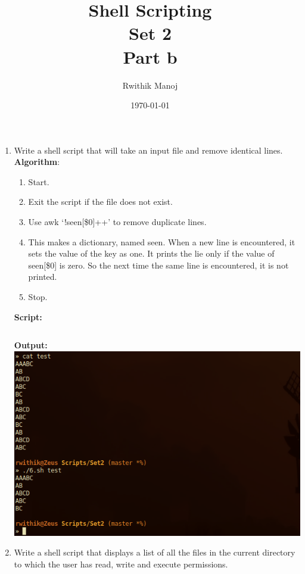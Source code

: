 \documentclass[10pt,a4paper,titlepage]{report}
\begin{document}
\begin{titlepage}
\author{Rwithik Manoj}
\title{Shell Scripting\\Set 2\\Part b}
\date{\today}
\maketitle
\end{titlepage}

\begin{enumerate}
\item Write a shell script that will take an input file and remove identical lines. \newline
\textbf{Algorithm}:\newline
\begin{enumerate}
	\item Start.
	\item Exit the script if the file does not exist.
	\item Use {\color{red}awk `!seen[\$0]++' } to remove duplicate lines.
	\item This makes a dictionary, named seen. When a new line is encountered, it sets the value of the key as one. It prints the lie only if the value of seen[\$0] is zero. So the next time the same line is encountered, it is not printed.
	\item Stop.
\end{enumerate}
\newline
\textbf{Script:}\newline
\inputminted{bash}{../Scripts/Set2/6.sh}
\textbf{Output:}\newline
\includegraphics[width=\linewidth]{../Images/Shell2/6.png}
\pagebreak
\item Write a shell script that displays a list of all the files in the current directory to which the user has read, write and execute permissions. \newline

\end{enumerate}
\end{document}
